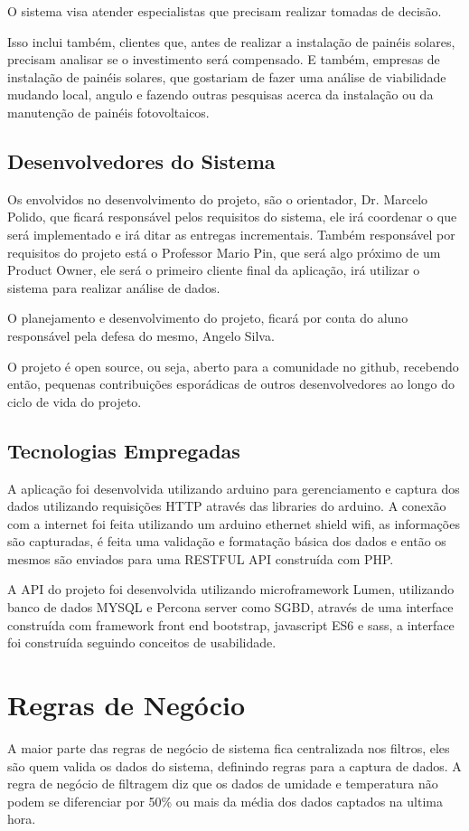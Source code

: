 O sistema visa atender especialistas que precisam realizar tomadas de decisão.

Isso inclui também, clientes que, antes de realizar a instalação de painéis solares, precisam analisar se o investimento será compensado. E também, empresas de instalação de painéis solares, que gostariam de fazer uma análise de viabilidade mudando local, angulo e fazendo outras pesquisas acerca da instalação ou da manutenção de painéis fotovoltaicos.

\subsection{Desenvolvedores do Sistema}

Os envolvidos no desenvolvimento do projeto, são o orientador, Dr. Marcelo Polido, que ficará responsável pelos requisitos do sistema, ele irá coordenar o que será implementado e irá ditar as entregas incrementais. Também responsável por requisitos do projeto está o Professor Mario Pin, que será algo próximo de um Product Owner, ele será o primeiro cliente final da aplicação, irá utilizar o sistema para realizar análise de dados.

O planejamento e desenvolvimento do projeto, ficará por conta do aluno responsável pela defesa do mesmo, Angelo Silva.

O projeto é open source, ou seja, aberto para a comunidade no github, recebendo então, pequenas contribuições esporádicas de outros desenvolvedores ao longo do ciclo de vida do projeto.

\subsection{Tecnologias Empregadas}

A aplicação foi desenvolvida utilizando arduino para gerenciamento e captura dos dados utilizando requisições HTTP através das libraries do arduino. A conexão com a internet foi feita utilizando um arduino ethernet shield wifi, as informações são capturadas, é feita uma validação e formatação básica dos dados e então os mesmos são enviados para uma RESTFUL API construída com PHP.

A API do projeto foi desenvolvida utilizando microframework Lumen, utilizando banco de dados MYSQL e Percona server como SGBD, através de uma interface construída com framework front end bootstrap, javascript ES6 e sass, a interface foi construída seguindo conceitos de usabilidade.

\section{Regras de Negócio}

A maior parte das regras de negócio de sistema fica centralizada nos filtros, eles são quem valida os dados do sistema, definindo regras para a captura de dados.
A regra de negócio de filtragem diz que os dados de umidade e temperatura não podem se diferenciar por 50\% ou mais da média dos dados captados na ultima hora.
